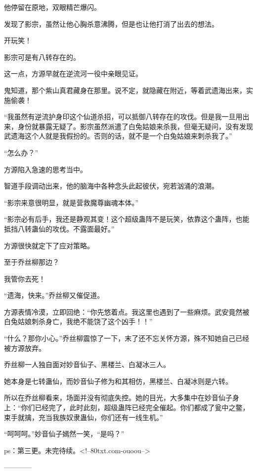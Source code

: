 \begin{this_body}
他停留在原地，双眼精芒爆闪。

发现了影宗，虽然让他心胸杀意沸腾，但是也让他打消了出去的想法。

开玩笑！

影宗可是有八转存在的。

这一点，方源早就在逆流河一役中亲眼见证。

鬼知道，那个紫山真君藏身在那里。说不定，就隐藏在附近，等着武遗海出来，实施偷袭！

“我虽然有逆流护身印这个仙道杀招，可以抵御八转存在的攻伐。但是我一旦用出来，身份就暴露无疑了。影宗虽然派遣了白兔姑娘来杀我，但毫无疑问，没有发现武遗海这个人就是我假扮的。否则的话，就不是一个白兔姑娘来刺杀我了。”

“怎么办？”

方源陷入急速的思考当中。

智道手段调动出来，他的脑海中各种念头此起彼伏，宛若汹涌的浪潮。

“影宗来意很明显，就是营救魔尊幽魂本体。”

“影宗必有后手，我还是静观其变！这个超级蛊阵不是玩笑，依靠这个蛊阵，也能抵挡八转蛊仙的攻伐。不露面最好。”

方源很快就定下了应对策略。

至于乔丝柳那边？

我管你去死！

“遗海，快来。”乔丝柳又催促道。

方源表情冷漠，立即回绝：“你先悠着点。我这里也遇到了一些麻烦。武安竟然被白兔姑娘刺杀身亡，我绝不能饶了这个凶手！！”

“什么？那你小心。”乔丝柳震惊了一下，末了还不忘关怀方源，殊不知她自己已经被方源放弃。

乔丝柳一人独自面对妙音仙子、黑楼兰、白凝冰三人。

她本身是七转蛊仙，而妙音仙子修为和其相仿，黑楼兰、白凝冰则是六转。

所以在乔丝柳看来，场面并没有彻底失控。她的目光，大多集中在妙音仙子身上：“你们已经完了，此时此刻，超级蛊阵已经完全催起。你们都成了瓮中之鳖，束手就擒，充当我族奴隶蛊仙，你们还有一线生机。”

“呵呵呵。”妙音仙子嫣然一笑，“是吗？”

ps：第三更。未完待续。<!--80txt.com-ouoou-->

------------

\end{this_body}

